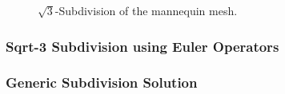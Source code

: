 \begin{figure}
    \caption{$\sqrt{3}$-Subdivision of the mannequin mesh.}
    \label{fig:sqrt3}\vspace*{-3mm}
\end{figure}



\newcommand{\mySqrt}{$\sqrt{3}$}
\subsubsection*{Sqrt-3 Subdivision using Euler Operators}


\subsubsection*{Generic Subdivision Solution}



%

